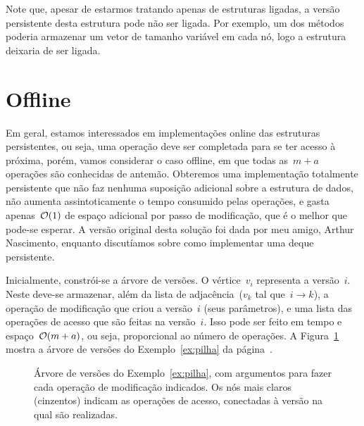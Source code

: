 \documentclass[main.tex]{subfiles}
\begin{document}
Note que, apesar de estarmos tratando apenas de estruturas ligadas, a versão persistente desta estrutura pode não ser ligada. Por exemplo, um dos métodos poderia armazenar um vetor de tamanho variável em cada nó, logo a estrutura deixaria de ser ligada.

\section{Offline}

Em geral, estamos interessados em implementações online das estruturas persistentes, ou seja, uma operação deve ser completada para se ter acesso à próxima, porém, vamos considerar o caso offline, em que todas as~$m+a$ operações são conhecidas de antemão. Obteremos uma implementação totalmente persistente que não faz nenhuma suposição adicional sobre a estrutura de dados, não aumenta assintoticamente o tempo consumido pelas operações, e gasta apenas~$\mathcal{O}(1)$ de espaço adicional por passo de modificação, que é o melhor que pode-se esperar. A versão original desta solução foi dada por meu amigo, Arthur Nascimento, enquanto discutíamos sobre como implementar uma deque persistente.

Inicialmente, constrói-se a árvore de versões. O vértice~$v_i$ representa a versão~$i$. Neste deve-se armazenar, além da lista de adjacência~($v_k$ tal que~$i \rightarrow k$), a operação de modificação que criou a versão~$i$ (seus parâmetros), e uma lista das operações de acesso que são feitas na versão~$i$. Isso pode ser feito em tempo e espaço~$\mathcal{O}(m+a)$, ou seja, proporcional ao número de operações.
A Figura~\ref{fig:vertree_ex} mostra a árvore de versões do Exemplo~\ref{ex:pilha} da página~\pageref{ex:pilha}.

\begin{figure}[h]
	\centering
	\caption{Árvore de versões do Exemplo~\ref{ex:pilha}, com argumentos para fazer cada operação de modificação indicados. Os nós mais claros (cinzentos) indicam as operações de acesso, conectadas à versão na qual são realizadas.} \label{fig:vertree_ex}
\end{figure}
\end{document}
